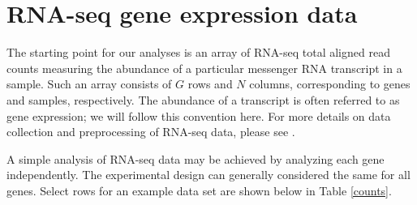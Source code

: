 \section{RNA-seq gene expression data}
\label{sec:data}
The starting point for our analyses is an array of RNA-seq total aligned read counts measuring the abundance of a particular messenger RNA transcript in a sample. Such an array consists of $G$ rows and $N$ columns, corresponding to genes and samples, respectively. The abundance of a transcript is often referred to as gene expression; we will follow this convention here. For more details on data collection and preprocessing of RNA-seq data, please see \citet{datta2014}.

A simple analysis of RNA-seq data may be achieved by analyzing each gene independently. The experimental design can generally considered the same for all genes. Select rows for an example data set are shown below in Table \ref{counts}.

\begin{table}[ht]
\centering
\begin{minipage}{.8\textwidth}
\caption{\small Selected rows from RNA-seq data set showing total aligned read counts for selected genes. Columns are grouped by genotype. Genes were selected as exemplars for different types of heterosis.}
\label{counts}
\end{minipage}
\\[.25cm]
\end{table}
% 
